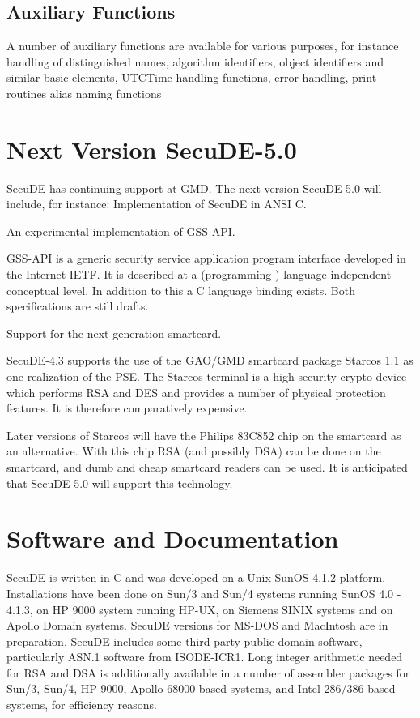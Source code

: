 \subsection{Auxiliary Functions}

A number of auxiliary functions are available for various purposes,
for instance
\bi
\m handling of distinguished names, algorithm identifiers, object
   identifiers and similar basic elements,
\m UTCTime handling functions,
\m error handling,
\m print routines
\m alias naming functions
\ei

\section{Next Version SecuDE-5.0}
SecuDE has continuing support at GMD. The next version SecuDE-5.0 will include, 
for instance:
\bi
\m Implementation of SecuDE in ANSI C.

\m An experimental implementation of GSS-API. 

   GSS-API is a generic security service application program interface
   developed in the Internet IETF. It is described at a (programming-) 
   language-independent conceptual level. In addition to this
   a C language binding exists. Both specifications are still drafts.
 
\m Support for the next generation smartcard. 

   SecuDE-4.3 supports the use of the GAO/GMD smartcard package Starcos 1.1 as
   one realization of the PSE. The Starcos terminal
   is a high-security crypto device which performs RSA and DES and provides a number of 
   physical protection features. It is therefore comparatively expensive. 

   Later versions of Starcos will have the Philips 83C852 chip on the smartcard as an 
   alternative. With this chip RSA (and possibly DSA) can be done on the smartcard, 
   and dumb and cheap smartcard readers can be used. It is anticipated that 
   SecuDE-5.0 will support this technology.
\ei

\section{Software and Documentation}

SecuDE is written in C and was developed on a Unix SunOS 4.1.2 platform.
Installations have been done on Sun/3 and Sun/4 systems running SunOS 4.0 - 4.1.3,
on HP 9000 system running HP-UX, on Siemens SINIX systems and on Apollo Domain systems.
SecuDE versions for MS-DOS and MacIntosh are in preparation.
SecuDE includes some third party public domain software, particularly ASN.1 software
from ISODE-ICR1. Long integer arithmetic
needed for RSA and DSA is additionally available in a number of assembler packages for Sun/3, Sun/4,
HP 9000, Apollo 68000 based systems, and Intel 286/386 based systems, for efficiency reasons.

